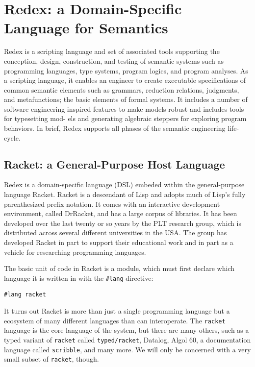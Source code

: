 \section{Redex: a Domain-Specific Language for Semantics}

Redex is a scripting language and set of associated tools supporting
the conception, design, construction, and testing of semantic systems
such as programming languages, type systems, program logics, and
program analyses. As a scripting language, it enables an engineer to
create executable specifications of common semantic elements such as
grammars, reduction relations, judgments, and metafunctions; the basic
elements of formal systems. It includes a number of software
engineering inspired features to make models robust and includes tools
for typesetting mod- els and generating algebraic steppers for
exploring program behaviors. In brief, Redex supports all phases of
the semantic engineering life-cycle.

\subsection{Racket: a General-Purpose Host Language}

Redex is a domain-specific language (DSL) embeded within the
general-purpose language Racket.  Racket is a descendant of Lisp and
adopts much of Lisp's fully parenthesized prefix notation.  It comes
with an interactive development environment, called DrRacket, and has
a large corpus of libraries.  It has been developed over the last
twenty or so years by the PLT research group, which is distributed
across several different universities in the USA.  The group has
developed Racket in part to support their educational work and in part
as a vehicle for researching programming languages.  

The basic unit of code in Racket is a module, which must first declare
which language it is written in with the {\tt \#lang} directive:
\begin{verbatim}
#lang racket
\end{verbatim}
It turns out Racket is more than just a single programming language
but a ecosystem of many different languages than can interoperate.
The {\tt racket} language is the core language of the system, but
there are many others, such as a typed variant of {\tt racket} called
{\tt typed/racket}, Datalog, Algol 60, a documentation language called
{\tt scribble}, and many more.  We will only be concerned with a very
small subset of {\tt racket}, though.

